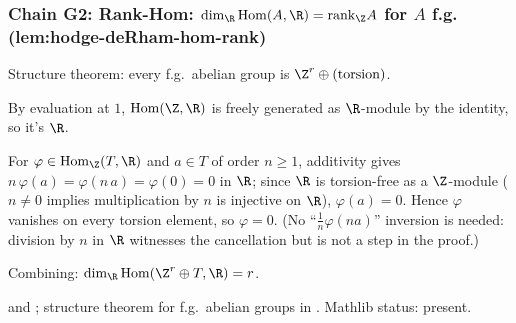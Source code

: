 \subsubsection*{Chain G2: Rank-Hom: $\dim_{\R}\mathrm{Hom}(A,\R) = \mathrm{rank}_{\Z} A$ for $A$ f.g. (lem:hodge-deRham-hom-rank)}

\begin{lemma}[Pass G2.1: decompose f.g.\ abelian $A = \Z^{r}\oplus T$ with $T$ torsion]
\label{lem:hdr-r1}
Structure theorem: every f.g.\ abelian group is $\Z^{r}\oplus(\text{torsion})$.
\leanok\mathlibok
\end{lemma}

\begin{lemma}[Pass G2.2: $\mathrm{Hom}(\Z, \R) = \R$]
\label{lem:hdr-r2}
By evaluation at $1$, $\mathrm{Hom}(\Z,\R)$ is freely generated as $\R$-module by the identity, so it's $\R$.
\leanok\mathlibok
\end{lemma}

\begin{lemma}[Pass G2.3: $\mathrm{Hom}(T, \R) = 0$ for torsion $T$]
\label{lem:hdr-r3}
For $\varphi \in \mathrm{Hom}_\Z(T, \R)$ and $a \in T$ of order $n \geq 1$, additivity gives $n\,\varphi(a) = \varphi(n\,a) = \varphi(0) = 0$ in $\R$; since $\R$ is torsion-free as a $\Z$-module ($n \neq 0$ implies multiplication by $n$ is injective on $\R$), $\varphi(a) = 0$.  Hence $\varphi$ vanishes on every torsion element, so $\varphi = 0$.  (No ``$\tfrac{1}{n}\varphi(na)$'' inversion is needed: division by $n$ in $\R$ witnesses the cancellation but is not a step in the proof.)
\leanok
\end{lemma}

\begin{lemma}[Pass G2.4: $\mathrm{Hom}(\Z^{r}\oplus T,\R) = \R^{r}$]
\label{lem:hdr-r4}
Combining: $\dim_{\R}\mathrm{Hom}(\Z^{r}\oplus T,\R) = r$.
\leanok\mathlibok
\end{lemma}

\begin{lemma}
\label{lem:hdr-r5}
 and ; structure theorem for f.g.\ abelian groups in .  Mathlib status: present.
\leanok\mathlibok
\end{lemma}

